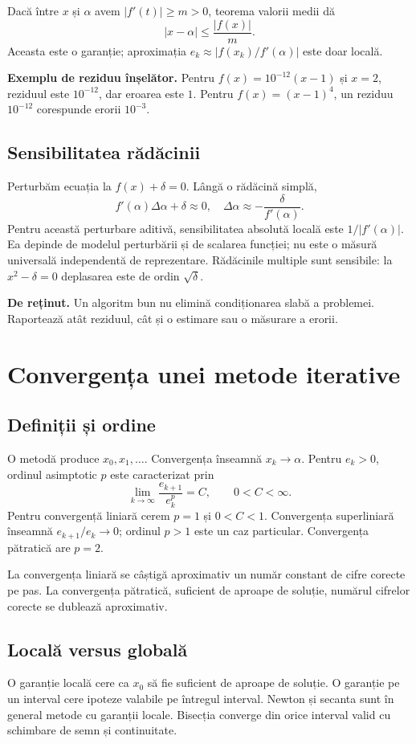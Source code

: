 \documentclass[11pt,a4paper]{article}
\newcommand{\important}[1]{\par\smallskip\textbf{De reținut.} #1\par\smallskip}
\begin{document}
Dacă între $x$ și $\alpha$ avem $|f'(t)|\ge m>0$, teorema valorii medii dă
\[
|x-\alpha|\le\frac{|f(x)|}{m}.
\]
Aceasta este o garanție; aproximația $e_k\approx|f(x_k)/f'(\alpha)|$ este doar locală.

\textbf{Exemplu de reziduu înșelător.} Pentru $f(x)=10^{-12}(x-1)$ și $x=2$, reziduul este $10^{-12}$, dar eroarea este $1$. Pentru $f(x)=(x-1)^4$, un reziduu $10^{-12}$ corespunde erorii $10^{-3}$.

\subsection{Sensibilitatea rădăcinii}
Perturbăm ecuația la $f(x)+\delta=0$. Lângă o rădăcină simplă,
\[
f'(\alpha)\Delta\alpha+\delta\approx0,
\quad\Delta\alpha\approx-\frac{\delta}{f'(\alpha)}.
\]
Pentru această perturbare aditivă, sensibilitatea absolută locală este $1/|f'(\alpha)|$. Ea depinde de modelul perturbării și de scalarea funcției; nu este o măsură universală independentă de reprezentare. Rădăcinile multiple sunt sensibile: la $x^2-\delta=0$ deplasarea este de ordin $\sqrt{\delta}$.

\important{Un algoritm bun nu elimină condiționarea slabă a problemei. Raportează atât reziduul, cât și o estimare sau o măsurare a erorii.}

\section{Convergența unei metode iterative}
\subsection{Definiții și ordine}
O metodă produce $x_0,x_1,\ldots$. Convergența înseamnă $x_k\to\alpha$. Pentru $e_k>0$, ordinul asimptotic $p$ este caracterizat prin
\[
\lim_{k\to\infty}\frac{e_{k+1}}{e_k^p}=C,\qquad 0<C<\infty.
\]
Pentru convergență liniară cerem $p=1$ și $0<C<1$. Convergența superliniară înseamnă $e_{k+1}/e_k\to0$; ordinul $p>1$ este un caz particular. Convergența pătratică are $p=2$.

La convergența liniară se câștigă aproximativ un număr constant de cifre corecte pe pas. La convergența pătratică, suficient de aproape de soluție, numărul cifrelor corecte se dublează aproximativ.

\subsection{Locală versus globală}
O garanție locală cere ca $x_0$ să fie suficient de aproape de soluție. O garanție pe un interval cere ipoteze valabile pe întregul interval. Newton și secanta sunt în general metode cu garanții locale. Bisecția converge din orice interval valid cu schimbare de semn și continuitate.
\end{document}
